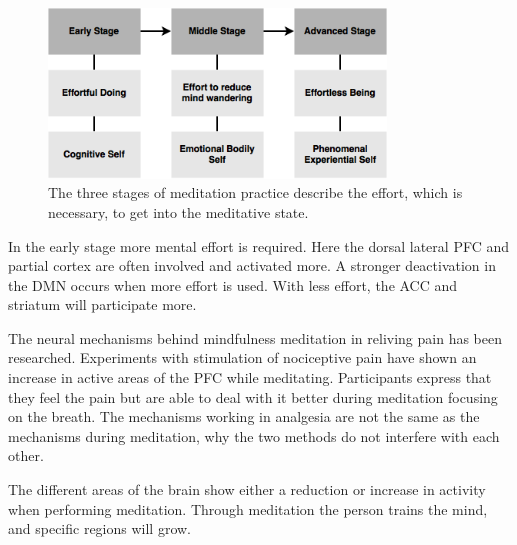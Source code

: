 \begin{figure}[H]
\includegraphics[width=0.8\textwidth]{figures/stages_of_meditation.png} 
	\caption{The three stages of meditation practice describe the effort, which is necessary, to get into the meditative state. \cite{Tang2017}}
	\label{fig:meditation_stages}  
\end{figure}  

In the early stage more mental effort is required. Here the dorsal lateral PFC and partial cortex are often involved and activated more. A stronger deactivation in the DMN occurs when more effort is used. With less effort, the ACC and striatum will participate more. \cite{Tang2017}

The neural mechanisms behind mindfulness meditation in reliving pain has been researched. Experiments with stimulation of nociceptive pain have shown an increase in active areas of the PFC while meditating. Participants express that they feel the pain but are able to deal with it better during meditation focusing on the breath. 
The mechanisms working in analgesia are not the same as the mechanisms during meditation, why the two methods do not interfere with each other. \cite{Jacob2016}

The different areas of the brain show either a reduction or increase in activity when performing meditation. Through meditation the person trains the mind, and specific regions will grow. \cite{Zeidan2012}


%
